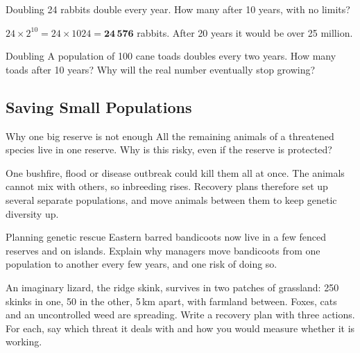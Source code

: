 \begin{workedex}{Doubling}
24 rabbits double every year. How many after 10 years, with no limits?

\smallskip
$24 \times 2^{10} = 24 \times 1024 = \mathbf{24\,576}$ rabbits. After 20 years it would be over 25 million.
\end{workedex}

\begin{wedo}{Doubling}
A population of 100 cane toads doubles every two years. How many toads after 10 years? Why will the real number eventually stop growing?
\workbox{5cm}
\end{wedo}

\subsection{Saving Small Populations}\label{sub:a7.2}

\begin{workedex}{Why one big reserve is not enough}
All the remaining animals of a threatened species live in one reserve. Why is this risky, even if the reserve is protected?

\smallskip
One bushfire, flood or disease outbreak could kill them all at once. The animals cannot mix with others, so inbreeding rises. Recovery plans therefore set up several separate populations, and move animals between them to keep genetic diversity up.
\end{workedex}

\begin{wedo}{Planning genetic rescue}
Eastern barred bandicoots now live in a few fenced reserves and on islands. Explain why managers move bandicoots from one population to another every few years, and one risk of doing so.
\answerbox{5cm}
\end{wedo}

\label{prac:7}




\label{ext:7}

\task An imaginary lizard, the ridge skink, survives in two patches of grassland: 250 skinks in one, 50 in the other, 5\,km apart, with farmland between. Foxes, cats and an uncontrolled weed are spreading. Write a recovery plan with three actions. For each, say which threat it deals with and how you would measure whether it is working.
\answerbox{9cm}

\clearpage
